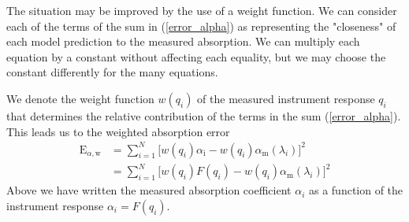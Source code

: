 \documentclass[8pt,a4paper]{report}
\begin{document}
	The situation may be improved by the use of a weight function. We can consider each of the terms of the sum in (\ref{error_alpha}) as representing the "closeness" of each model prediction to the measured absorption. We can multiply each equation by a constant without affecting each equality, but we may choose the constant differently for the many equations. 
	
	We denote the weight function $w(q_i)$ of the measured instrument response $q_i$ that determines the relative contribution of the terms in the sum (\ref{error_alpha}). This leads us to the weighted absorption error
	\begin{align} \label{error_weighted}
		\mathrm{E}_{\alpha,\mathrm{w}} &= \sum_{i=1}^{N} \Big[w(q_i)\alpha_\mathrm{i} - w(q_i)\alpha_\mathrm{m}\left(\lambda_i\right) \Big]^2 \nonumber \\
		&= \sum_{i=1}^{N} \Big[w(q_i)F(q_i) - w(q_i)\alpha_\mathrm{m}\left(\lambda_i\right) \Big]^2
	\end{align}
	Above we have written the measured absorption coefficient $\alpha_i$ as a function of the instrument response $\alpha_i = F(q_i)$.
	
\end{document}
